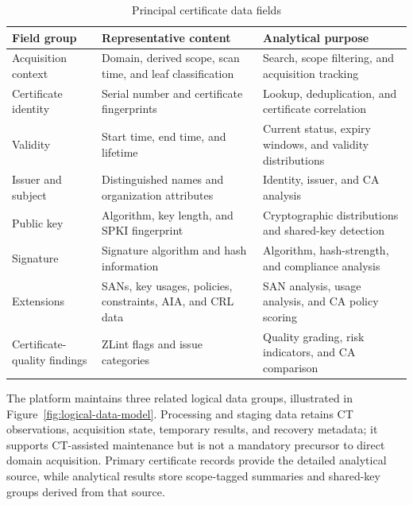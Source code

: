\begin{table}[H]
  \centering
  \small
  \setlength{\tabcolsep}{4pt}
  \caption{Principal certificate data fields}
  \label{tab:main-certificate-fields}
  \begin{tabularx}{\textwidth}{@{}>{\RaggedRight\arraybackslash}p{}>{\RaggedRight\arraybackslash}p{}Y@{}}
    \toprule
    \textbf{Field group} & \textbf{Representative content} & \textbf{Analytical purpose} \\
    \midrule
    Acquisition context & Domain, derived scope, scan time, and leaf classification & Search, scope filtering, and acquisition tracking \\
    Certificate identity & Serial number and certificate fingerprints & Lookup, deduplication, and certificate correlation \\
    Validity & Start time, end time, and lifetime & Current status, expiry windows, and validity distributions \\
    Issuer and subject & Distinguished names and organization attributes & Identity, issuer, and CA analysis \\
    Public key & Algorithm, key length, and SPKI fingerprint & Cryptographic distributions and shared-key detection \\
    Signature & Signature algorithm and hash information & Algorithm, hash-strength, and compliance analysis \\
    Extensions & SANs, key usages, policies, constraints, AIA, and CRL data & SAN analysis, usage analysis, and CA policy scoring \\
    Certificate-quality findings & ZLint flags and issue categories & Quality grading, risk indicators, and CA comparison \\
    \bottomrule
  \end{tabularx}
\end{table}

The platform maintains three related logical data groups, illustrated in
Figure~\ref{fig:logical-data-model}. Processing and staging data retains CT
observations, acquisition state, temporary results, and recovery metadata; it
supports CT-assisted maintenance but is not a mandatory precursor to direct
domain acquisition. Primary certificate records provide the detailed
analytical source, while analytical results store scope-tagged summaries and
shared-key groups derived from that source.

